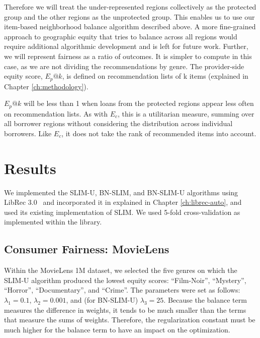 Therefore we will treat the under-represented regions collectively as the protected group and the other regions as the unprotected group. This enables us to use our item-based neighborhood balance algorithm described above. A more fine-grained approach to geographic equity that tries to balance across all regions would require additional algorithmic development and is left for future work. Further, we will represent fairness as a ratio of outcomes. It is simpler to compute in this case, as we are not dividing the recommendations by genre. The provider-side equity score, $E_p@k$, is defined on recommendation lists of k items (explained in Chapter \ref{ch:methodology}). 




$E_p@k$ will be less than 1 when loans from the protected regions appear less often on recommendation lists. As with $E_c$, this is a utilitarian measure, summing over all borrower regions without considering the distribution across individual borrowers. Like $E_c$, it does not take the rank of recommended items into account.


\section{Results}

We implemented the SLIM-U, BN-SLIM, and BN-SLIM-U algorithms using LibRec 3.0~\cite{guo2015librec} and incorporated it in \libauto{} explained in Chapter \ref{ch:librec-auto}, and used its existing implementation of SLIM. We used 5-fold cross-validation as implemented within the library.

\subsection{Consumer Fairness: MovieLens}

Within the MovieLens 1M dataset, we selected the five genres on which the SLIM-U algorithm produced the lowest equity scores: ``Film-Noir'', ``Mystery'', ``Horror'', ``Documentary'', and ``Crime''. The parameters were set as follows: $\lambda_1 = 0.1$, $\lambda_2 = 0.001$, and (for BN-SLIM-U) $\lambda_3 = 25$. Because the balance term measures the difference in weights, it tends to be much smaller than the terms that measure the sums of weights. Therefore, the regularization constant must be much higher for the balance term to have an impact on the optimization. 

